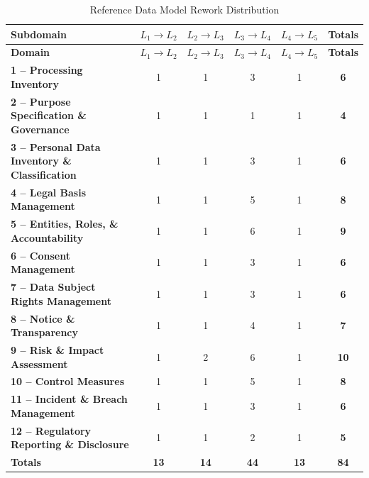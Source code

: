 \documentclass[10pt,letterpaper,twocolumn,twoside]{rho-class/rho}
\begin{document}
\begin{small}
\setlength{\tabcolsep}{5pt}
\renewcommand{\arraystretch}{1.15}

\begin{longtable}{p{}ccccc}
\caption{Reference Data Model Rework Distribution}
\label{tab:reference-data-model-rework-distribution} \\

\hline
\textbf{Subdomain} &
\textbf{$L_1 \to L_2$} &
\textbf{$L_2 \to L_3$} &
\textbf{$L_3 \to L_4$} &
\textbf{$L_4 \to L_5$} &
\textbf{Totals} \\
\hline
\endfirsthead

\hline
\textbf{Domain} &
\textbf{$L_1 \to L_2$} &
\textbf{$L_2 \to L_3$} &
\textbf{$L_3 \to L_4$} &
\textbf{$L_4 \to L_5$} &
\textbf{Totals} \\
\hline
\endhead

\hline
\endfoot

\hline
\endlastfoot

\textbf{1 -- Processing Inventory} & 1 & 1 & 3 & 1 & \textbf{6} \\
\textbf{2 -- Purpose Specification \& Governance} & 1 & 1 & 1 & 1 & \textbf{4} \\
\textbf{3 -- Personal Data Inventory \& Classification} & 1 & 1 & 3 & 1 & \textbf{6} \\
\textbf{4 -- Legal Basis Management} & 1 & 1 & 5 & 1 & \textbf{8} \\
\textbf{5 -- Entities, Roles, \& Accountability} & 1 & 1 & 6 & 1 & \textbf{9} \\
\textbf{6 -- Consent Management} & 1 & 1 & 3 & 1 & \textbf{6} \\
\textbf{7 -- Data Subject Rights Management} & 1 & 1 & 3 & 1 & \textbf{6} \\
\textbf{8 -- Notice \& Transparency} & 1 & 1 & 4 & 1 & \textbf{7} \\
\textbf{9 -- Risk \& Impact Assessment} & 1 & 2 & 6 & 1 & \textbf{10} \\
\textbf{10 -- Control Measures} & 1 & 1 & 5 & 1 & \textbf{8} \\
\textbf{11 -- Incident \& Breach Management} & 1 & 1 & 3 & 1 & \textbf{6} \\
\textbf{12 -- Regulatory Reporting \& Disclosure} & 1 & 1 & 2 & 1 & \textbf{5} \\
\hline
\textbf{Totals} & \textbf{13} & \textbf{14} & \textbf{44} & \textbf{13} & \textbf{84} \\

\end{longtable}
\end{small}
\end{document}
